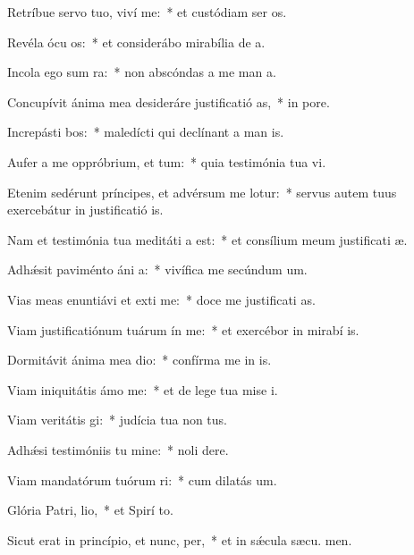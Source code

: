 \item Retríbue servo tuo, viví me:~* et custódiam ser os.
\item Revéla ócu os:~* et considerábo mirabília de  a.
\item Incola ego sum  ra:~* non abscóndas a me man a.
\item Concupívit ánima mea desideráre justificatió as,~* in  pore.
\item Increpásti bos:~* maledícti qui declínant a man is.
\item Aufer a me oppróbrium, et tum:~* quia testimónia tua vi.
\item Etenim sedérunt príncipes, et advérsum me lotur:~* servus autem tuus exercebátur in justificatió is.
\item Nam et testimónia tua meditáti a est:~* et consílium meum justificati æ.
\item Adhǽsit paviménto áni a:~* vivífica me secúndum  um.
\item Vias meas enuntiávi et exti me:~* doce me justificati as.
\item Viam justificatiónum tuárum ín me:~* et exercébor in mirabí is.
\item Dormitávit ánima mea  dio:~* confírma me in  is.
\item Viam iniquitátis ámo  me:~* et de lege tua mise i.
\item Viam veritátis gi:~* judícia tua non  tus.
\item Adhǽsi testimóniis tu mine:~* noli  dere.
\item Viam mandatórum tuórum ri:~* cum dilatás  um.
\item Glória Patri,  lio,~* et Spirí to.
\item Sicut erat in princípio, et nunc,  per,~* et in sǽcula sæcu. men.
